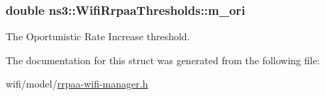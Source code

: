 \subsubsection[{\texorpdfstring{m\+\_\+ori}{m_ori}}]{\setlength{\rightskip}{0pt plus 5cm}double ns3\+::\+Wifi\+Rrpaa\+Thresholds\+::m\+\_\+ori}\hypertarget{structns3_1_1WifiRrpaaThresholds_a43ec6ffaf79ea43b54d46009188be3a9}{}\label{structns3_1_1WifiRrpaaThresholds_a43ec6ffaf79ea43b54d46009188be3a9}


The Oportunistic Rate Increase threshold. 



The documentation for this struct was generated from the following file\+:\begin{DoxyCompactItemize}
\item 
wifi/model/\hyperlink{rrpaa-wifi-manager_8h}{rrpaa-\/wifi-\/manager.\+h}\end{DoxyCompactItemize}
